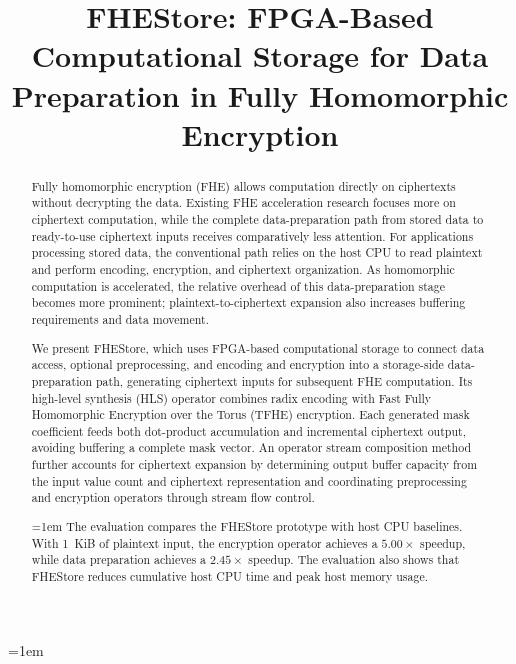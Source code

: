 \documentclass[sigconf,anonymous,balance=false]{acmart}
\title[FHEStore: Data Preparation for FHE]{FHEStore: FPGA-Based Computational Storage for Data Preparation in Fully Homomorphic Encryption}
\begin{document}
\begin{abstract}
Fully homomorphic encryption (FHE) allows computation directly on ciphertexts without decrypting the data. Existing FHE acceleration research focuses more on ciphertext computation, while the complete data-preparation path from stored data to ready-to-use ciphertext inputs receives comparatively less attention. For applications processing stored data, the conventional path relies on the host CPU to read plaintext and perform encoding, encryption, and ciphertext organization. As homomorphic computation is accelerated, the relative overhead of this data-preparation stage becomes more prominent; plaintext-to-ciphertext expansion also increases buffering requirements and data movement.

We present FHEStore, which uses FPGA-based computational storage to connect data access, optional preprocessing, and encoding and encryption into a storage-side data-preparation path, generating ciphertext inputs for subsequent FHE computation. Its high-level synthesis (HLS) operator combines radix encoding with Fast Fully Homomorphic Encryption over the Torus (TFHE) encryption. Each generated mask coefficient feeds both dot-product accumulation and incremental ciphertext output, avoiding buffering a complete mask vector. An operator stream composition method further accounts for ciphertext expansion by determining output buffer capacity from the input value count and ciphertext representation and coordinating preprocessing and encryption operators through stream flow control.

\begingroup
\emergencystretch=1em
The evaluation compares the FHEStore prototype with host CPU baselines. With 1~KiB of plaintext input, the encryption operator achieves a $5.00\times$ speedup, while data preparation achieves a $2.45\times$ speedup. The evaluation also shows that FHEStore reduces cumulative host CPU time and peak host memory usage.
\par\endgroup
\end{abstract}


\raggedbottom
\makeatletter
{}
\makeatother
\emergencystretch=1em
\maketitle
\emergencystretch=0pt
\end{document}
